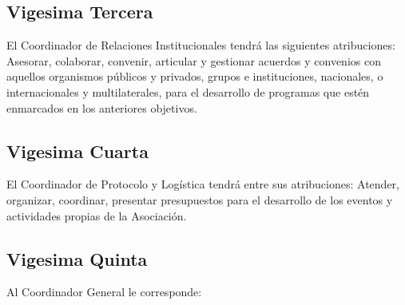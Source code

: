     \subsection{Vigesima Tercera}
      El Coordinador de Relaciones Institucionales tendr\'a las siguientes
      atribuciones: Asesorar, colaborar, convenir, articular y gestionar
      acuerdos y convenios con aquellos organismos p\'ublicos y privados, grupos
      e instituciones, nacionales, o internacionales y multilaterales, para el
      desarrollo de programas que est\'en enmarcados en los anteriores
      objetivos.

    \subsection{Vigesima Cuarta}
      El Coordinador de Protocolo y Log\'i{}stica tendr\'a entre sus
      atribuciones: Atender, organizar, coordinar, presentar presupuestos para
      el desarrollo de los eventos y actividades propias de la Asociaci\'on.
    
    \subsection{Vigesima Quinta}
       Al Coordinador General le corresponde:

